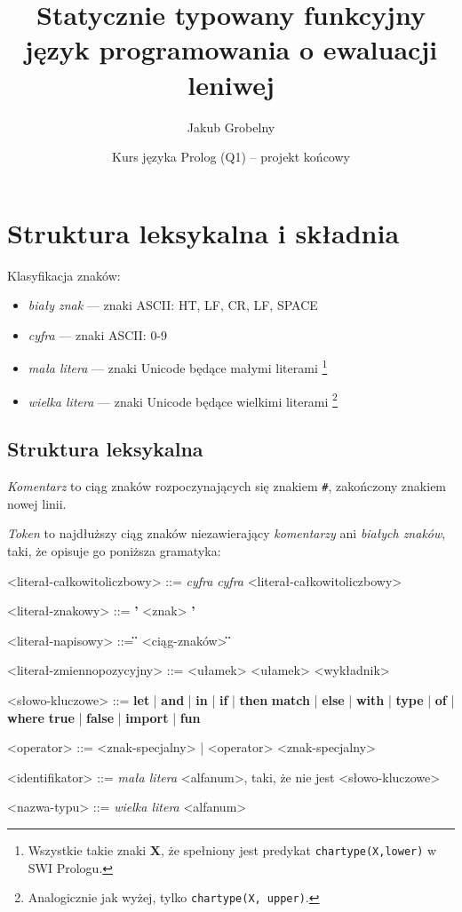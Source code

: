 \documentclass[12pt]{article}
\title{\huge
    \textbf{Statycznie typowany funkcyjny język programowania o ewaluacji leniwej}}
\date {Kurs języka Prolog (Q1) -- projekt końcowy}
\author{\Large Jakub Grobelny}
\begin{document}
\maketitle

\section{Struktura leksykalna i składnia}

Klasyfikacja znaków:
\begin{itemize}
    \item \textit{biały znak} --- znaki ASCII: HT, LF, CR, LF, SPACE
    \item \textit{cyfra} --- znaki ASCII: 0-9
    \item \textit{mała litera} --- znaki Unicode będące małymi literami 
    \footnote{Wszystkie takie znaki \textbf{X}, że spełniony jest predykat 
        \texttt{char\textunderscore type(X,lower)} w SWI Prologu.}
    \item \textit{wielka litera} --- znaki Unicode będące wielkimi literami
    \footnote{Analogicznie jak wyżej, tylko 
        \texttt{char\textunderscore type(X, upper)}.}
\end{itemize}

\subsection{Struktura leksykalna}

\textit{Komentarz} to ciąg znaków rozpoczynających się znakiem \texttt{\#}, 
zakończony znakiem nowej linii.

\textit{Token} to najdłuższy ciąg znaków niezawierający \textit{komentarzy} ani 
\textit{białych znaków}, taki, że opisuje go poniższa gramatyka:

\begin{grammar}

<literał-całkowitoliczbowy> ::=
    \textit{cyfra} 
    \alt \textit{cyfra} <literał-całkowitoliczbowy>

<literał-znakowy> ::=
    \textbf{'} <znak> \textbf{'}

<literał-napisowy> ::=
    \textbf{\"} <ciąg-znaków> \textbf{\"}

<literał-zmiennopozycyjny> ::=
    <ułamek>
    \alt <ułamek> <wykładnik>

<słowo-kluczowe> ::=
    \textbf{let}
    | \textbf{and}
    | \textbf{in}
    | \textbf{if}
    | \textbf{then}
    \alt \textbf{match}
    | \textbf{else}
    | \textbf{with}
    | \textbf{type}
    | \textbf{of}
    | \textbf{where}
    \alt \textbf{true}
    | \textbf{false}
    | \textbf{import}
    | \textbf{fun}

<operator> ::= <znak-specjalny> | <operator> <znak-specjalny>

<identifikator> ::= 
    \textit{mała litera} <alfanum>, taki, że nie jest <słowo-kluczowe>

<nazwa-typu> ::=
    \textit{wielka litera} <alfanum>

\end{grammar}
\end{document}
